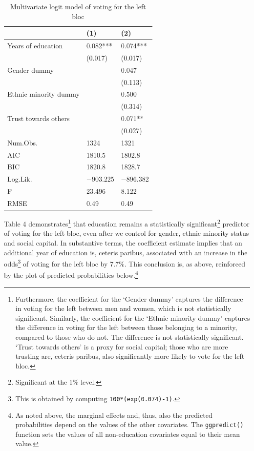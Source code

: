 \documentclass[
]{article}
\begin{document}
\begin{table}[!h]

\caption{\label{tab:multi-logit-table}Multivariate logit model of voting for the left bloc}
\centering
\begin{tabu} to 
\toprule
  & (1) & (2)\\
\midrule
Years of education & \num{0.082}*** & \num{0.074}***\\
 & (\num{0.017}) & (\num{0.017})\\
Gender dummy &  & \num{0.047}\\
 &  & (\num{0.113})\\
Ethnic minority dummy &  & \num{0.500}\\
 &  & (\num{0.314})\\
Trust towards others &  & \num{0.071}**\\
 &  & (\num{0.027})\\
\midrule
Num.Obs. & \num{1324} & \num{1321}\\
AIC & \num{1810.5} & \num{1802.8}\\
BIC & \num{1820.8} & \num{1828.7}\\
Log.Lik. & \num{-903.225} & \num{-896.382}\\
F & \num{23.496} & \num{8.122}\\
RMSE & \num{0.49} & \num{0.49}\\
\bottomrule
\end{tabu}
\end{table}

Table 4 demonstrates\footnote{Furthermore, the coefficient for the
  `Gender dummy' captures the difference in voting for the left between
  men and women, which is not statistically significant. Similarly, the
  coefficient for the `Ethnic minority dummy' captures the difference in
  voting for the left between those belonging to a minority, compared to
  those who do not. The difference is not statistically significant.
  `Trust towards others' is a proxy for social capital; those who are
  more trusting are, ceteris paribus, also significantly more likely to
  vote for the left bloc.} that education remains a statistically
significant\footnote{Significant at the 1\% level.} predictor of voting
for the left bloc, even after we control for gender, ethnic minority
status and social capital. In substantive terms, the coefficient
estimate implies that an additional year of education is, ceteris
paribus, associated with an increase in the odds\footnote{This is
  obtained by computing \texttt{100*(exp(0.074)-1)}.} of voting for the
left bloc by 7.7\%. This conclusion is, as above, reinforced by the plot
of predicted probabilities below.\footnote{As noted above, the marginal
  effects and, thus, also the predicted probabilities depend on the
  values of the other covariates. The \texttt{ggpredict()} function sets
  the values of all non-education covariates equal to their mean value.}
\end{document}
